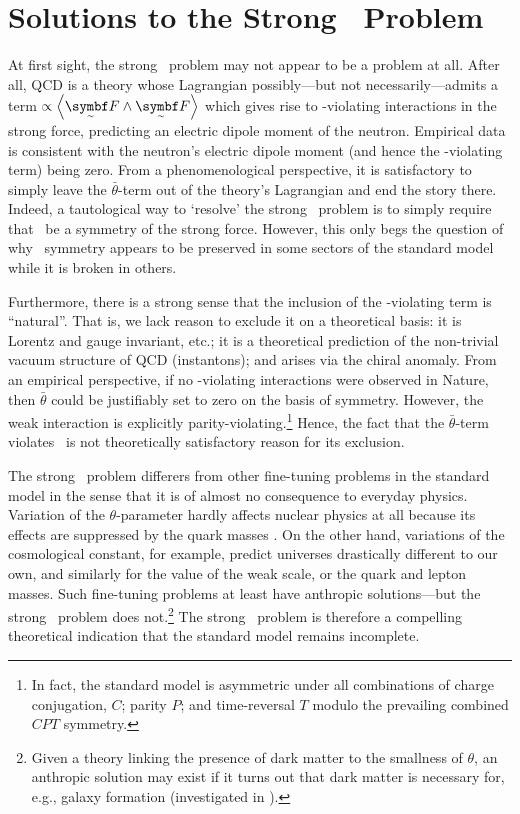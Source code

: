 \chapter{Solutions to the Strong \CP\ Problem}

At first sight, the strong \CP\ problem may not appear to be a problem at all.
After all, QCD is a theory whose Lagrangian possibly---but not necessarily---admits a term $\propto \angbr{\tsbm F \wedge \tsbm F}$ which gives rise to \CP-violating interactions in the strong force, predicting an electric dipole moment of the neutron.
Empirical data is consistent with the neutron's electric dipole moment (and hence the \CP-violating term) being zero.
From a phenomenological perspective, it is satisfactory to simply leave the $\bar θ$-term out of the theory's Lagrangian and end the story there.
Indeed, a tautological way to `resolve' the strong \CP\ problem is to simply require that \CP\ be a symmetry of the strong force.
However, this only begs the question of why \CP\ symmetry appears to be preserved in some sectors of the standard model while it is broken in others.

Furthermore, there is a strong sense that the inclusion of the \CP-violating term is ``natural''.
That is, we lack reason to exclude it on a theoretical basis: it is Lorentz and gauge invariant, etc.; it is a theoretical prediction of the non-trivial vacuum structure of QCD (instantons); and arises via the chiral anomaly.
From an empirical perspective, if no \CP-violating interactions were observed in Nature, then $\bar θ$ could be justifiably set to zero on the basis of symmetry.
However, the weak interaction is explicitly parity-violating.\footnote{
	In fact, the standard model is asymmetric under all combinations of charge conjugation, $C$; parity $P$; and time-reversal $T$ modulo the prevailing combined $CPT$ symmetry.
}
Hence, the fact that the $\bar θ$-term violates \CP\ is not theoretically satisfactory reason for its exclusion.





The strong \CP\ problem differers from other fine-tuning problems in the standard model in the sense that it is of almost no consequence to everyday physics.
Variation of the $θ$-parameter hardly affects nuclear physics at all because its effects are suppressed by the quark masses \cite{Dine_2018}.
On the other hand, variations of the cosmological constant, for example, predict universes drastically different to our own, and similarly for the value of the weak scale, or the quark and lepton masses.
Such fine-tuning problems at least have anthropic solutions---but the strong \CP\ problem does not.\footnote{
	Given a theory linking the presence of dark matter to the smallness of $θ$, an anthropic solution may exist if it turns out that dark matter is necessary for, e.g., galaxy formation (investigated in \cite{Dine_2018}).
}
The strong \CP\ problem is therefore a compelling theoretical indication that the standard model remains incomplete.

